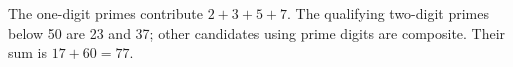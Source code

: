 The one-digit primes contribute $2+3+5+7$. The qualifying two-digit primes below 50 are 23 and 37; other candidates using prime digits are composite. Their sum is $17+60=\boxed{77}$.
